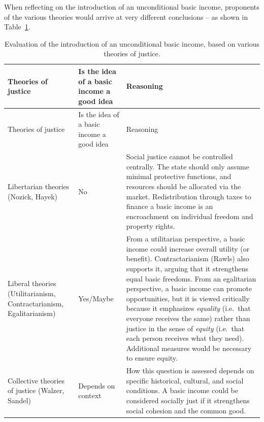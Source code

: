 \documentclass[
  a4paper,
  openany]{book}
\begin{document}
When reflecting on the introduction of an unconditional basic income,
proponents of the various theories would arrive at very different
conclusions -- as shown in Table~\ref{tbl-EvalJustice}.

\begin{longtable}[]{@{}
  >{\raggedright\arraybackslash}p{}
  >{\raggedright\arraybackslash}p{}
  >{\raggedright\arraybackslash}p{}@{}}
\caption{Evaluation of the introduction of an unconditional basic
income, based on various theories of
justice.}\label{tbl-EvalJustice}\tabularnewline
\toprule\noalign{}
\begin{minipage}[b]{\linewidth}\raggedright
Theories of justice
\end{minipage} & \begin{minipage}[b]{\linewidth}\raggedright
Is the idea of a basic income a good idea
\end{minipage} & \begin{minipage}[b]{\linewidth}\raggedright
Reasoning
\end{minipage} \\
\midrule\noalign{}
\endfirsthead
\toprule\noalign{}
\begin{minipage}[b]{\linewidth}\raggedright
Theories of justice
\end{minipage} & \begin{minipage}[b]{\linewidth}\raggedright
Is the idea of a basic income a good idea
\end{minipage} & \begin{minipage}[b]{\linewidth}\raggedright
Reasoning
\end{minipage} \\
\midrule\noalign{}
\endhead
\bottomrule\noalign{}
\endlastfoot
Libertarian theories (Nozick, Hayek) & No & Social justice cannot be
controlled centrally. The state should only assume minimal protective
functions, and resources should be allocated via the market.
Redistribution through taxes to finance a basic income is an
encroachment on individual freedom and property rights. \\
Liberal theories (Utilitarianism, Contractarianism, Egalitarianism) &
Yes/Maybe & From a utilitarian perspective, a basic income could
increase overall utility (or benefit). Contractarianism (Rawls) also
supports it, arguing that it strengthens equal basic freedoms. From an
egalitarian perspective, a basic income can promote opportunities, but
it is viewed critically because it emphasizes \emph{equality} (i.e.~that
everyone receives the same) rather than justice in the sense of
\emph{equity} (i.e.~that each person receives what they need).
Additional measures would be necessary to ensure equity. \\
Collective theories of justice (Walzer, Sandel) & Depends on context &
How this question is assessed depends on specific historical, cultural,
and social conditions. A basic income could be considered socially just
if it strengthens social cohesion and the common good. \\
\end{longtable}
\end{document}
